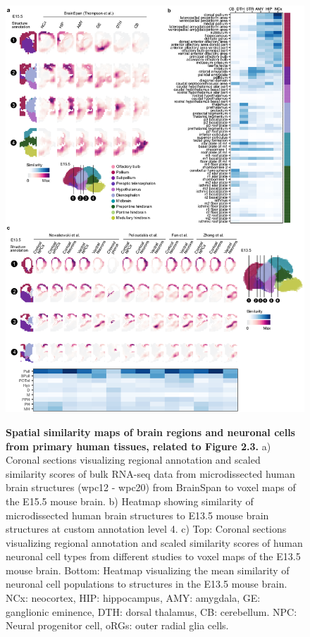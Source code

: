 \begin{figure}[h!]
    \centering
	\includegraphics[width=\textwidth]{figures/voxhunt/Supp_3}
    \label{fig:voxS3}
\end{figure}

\begin{figure}[t!]
    \centering
    \caption{\textbf{Spatial similarity maps of brain regions and neuronal cells from primary human tissues, related to Figure 2.3.} a) Coronal sections visualizing regional annotation and scaled similarity scores of bulk RNA-seq data from microdissected human brain structures (wpc12 - wpc20) from BrainSpan to voxel maps of the E15.5 mouse brain. b) Heatmap showing similarity of microdissected human brain structures to E13.5 mouse brain structures at custom annotation level 4. c) Top: Coronal sections visualizing regional annotation and scaled similarity scores of human neuronal cell types from different studies to voxel maps of the E13.5 mouse brain. Bottom: Heatmap visualizing the mean similarity of neuronal cell populations to structures in the E13.5 mouse brain. NCx: neocortex, HIP: hippocampus, AMY: amygdala, GE: ganglionic eminence, DTH: dorsal thalamus, CB: cerebellum. NPC: Neural progenitor cell, oRGs: outer radial glia cells.}
\end{figure}


